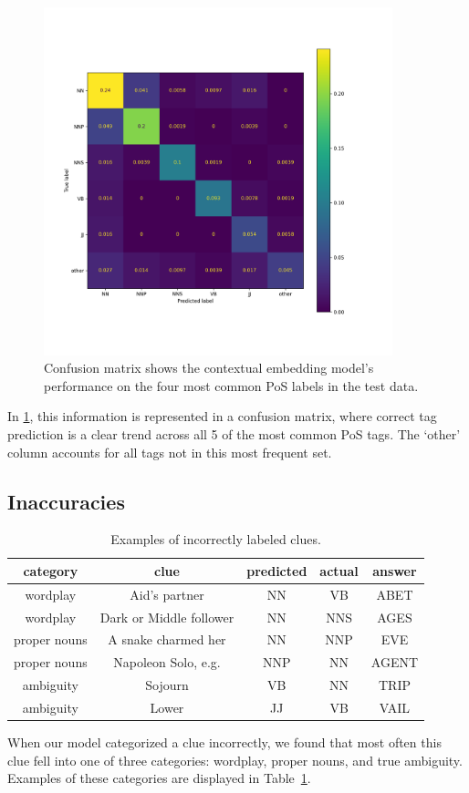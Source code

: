 \documentclass[11pt]{article}
\begin{document}
\begin{figure}[p]
    \centering
    \includegraphics[width=0.9\textwidth]{figures/confusion.png}
    \caption{Confusion matrix shows the contextual embedding model's performance on the four most common PoS labels in the test data. }
    \label{fig:confusion}
\end{figure}
In \ref{fig:confusion}, this information is represented in a confusion matrix, where correct tag prediction is a clear trend across all 5 of the most common PoS tags. The `other' column accounts for all tags not in this most frequent set.
\subsection{Inaccuracies}
\begin{table}[t]
    \centering
    \begin{tabular}{c|c|c|c|c}
        category & clue & predicted & actual & answer\\\hline
        wordplay & Aid's partner & NN & VB & ABET \\
        wordplay & Dark or Middle follower & NN & NNS & AGES \\
        proper nouns & A snake charmed her & NN & NNP & EVE \\
        proper nouns & Napoleon Solo, e.g. & NNP & NN & AGENT \\
        ambiguity & Sojourn & VB & NN & TRIP \\
        ambiguity & Lower & JJ & VB & VAIL \\
    \end{tabular}
    \caption{Examples of incorrectly labeled clues.}
    \label{tab:incorrect}
\end{table}
When our model categorized a clue incorrectly, we found that most often this clue fell into one of three categories: wordplay, proper nouns, and true ambiguity. Examples of these categories are displayed in Table~\ref{tab:incorrect}. 
\end{document}
